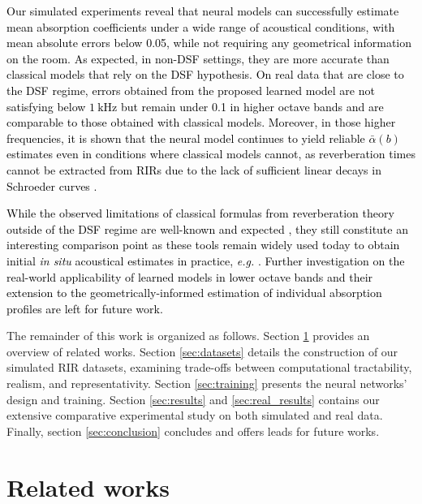 \documentclass[reprint]{JASA}
\begin{document}
\textcolor{black}{Our simulated experiments reveal that neural models can successfully estimate mean absorption coefficients under a wide range of acoustical conditions, with mean absolute errors below 0.05, while not requiring any geometrical information on the room. As expected, in non-DSF settings, they are more accurate than classical models that rely on the DSF hypothesis. On real data that are close to the DSF regime, errors obtained from the proposed learned model are not satisfying below $1~\textrm{kHz}$ but remain under 0.1 in higher octave bands and are comparable to those obtained with classical models. Moreover, in those higher frequencies, it is shown that the neural model continues to yield reliable $\bar{\alpha}(b)$ estimates even in conditions where classical models cannot, as reverberation times cannot be extracted from RIRs due to the lack of sufficient linear decays in Schroeder curves \cite{Schroeder:65}.}

\textcolor{black}{While the observed limitations of classical formulas from reverberation theory outside of the DSF regime are well-known and expected \cite{nolan2018wavenumber}, they still constitute an interesting comparison point as these tools remain widely used today to obtain initial \textit{in situ} acoustical estimates in practice, \textit{e.g.} \cite{prawda2020evaluation}. Further investigation on the real-world applicability of learned models in lower octave bands and their extension to the geometrically-informed estimation of individual absorption profiles are left for future work.}

The remainder of this work is organized as follows. Section \ref{subsec:related} provides an overview of related works. Section \ref{sec:datasets} details the construction of our simulated RIR datasets, examining trade-offs between computational tractability, realism, and representativity. Section \ref{sec:training} presents the neural networks' design and training. Section \ref{sec:results} and \ref{sec:real_results}  contains our extensive comparative experimental study on both simulated and real data. Finally, section \ref{sec:conclusion} concludes and offers leads for future works.

\section{Related works}
\label{subsec:related}
\end{document}
